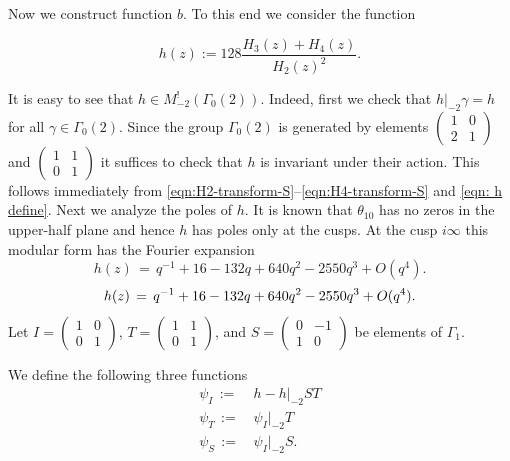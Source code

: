 Now we construct function $b$. To this end we consider the function
\begin{definition}\label{def: h}\leanok
\begin{equation}\label{eqn: h define}
    h(z) := 128 \frac{H_3(z) + H_4(z)}{H_2(z)^2}.
\end{equation}
\end{definition}
It is easy to see that $h\in M^!_{-2}(\Gamma_0(2))$. Indeed, first we check that $h|_{-2}\gamma=h$
for all $\gamma\in\Gamma_0(2)$. Since the group $\Gamma_0(2)$ is generated by elements
$\left(\begin{smallmatrix}1&0\\2&1\end{smallmatrix}\right)$ and $\left(\begin{smallmatrix}1&1\\0&1\end{smallmatrix}\right)$
it suffices to check that $h$ is invariant under their action. This follows immediately
from \eqref{eqn:H2-transform-S}--\eqref{eqn:H4-transform-S} and \eqref{eqn: h define}. Next we analyze the poles of $h$.
It is known \cite[Chapter~I Lemma~4.1]{Mumford} that $\theta_{10}$ has no zeros in the upper-half plane and hence $h$ has poles only at the cusps.
At the cusp $i\infty$ this modular form has the Fourier expansion
\ifplastex
\begin{equation*}
h(z)\,=\,q^{-1} + 16 - 132 q + 640 q^2 - 2550 q^3+O(q^4).
\end{equation*}
\else
\begin{equation}
h(z)\,=\,q^{-1} + 16 - 132 q + 640 q^2 - 2550 q^3+O(q^4).\notag
\end{equation}
\fi
Let $I=\left(\begin{smallmatrix}1&0\\0&1\end{smallmatrix}\right)$,
$T=\left(\begin{smallmatrix}1&1\\0&1\end{smallmatrix}\right)$, and
$S=\left(\begin{smallmatrix}0&-1\\1&0\end{smallmatrix}\right)$ be elements of $\Gamma_1$.
\begin{definition}\label{def:psiI-psiT-psiS}\leanok
We define the following three functions
\begin{align}
    \psi_I\,:=\,&h-h|_{-2}ST \label{eqn:psiI-define}\\
    \psi_T\,:=\,&\psi_I|_{-2}T \label{eqn:psiT-define}\\
    \psi_S\,:=\,&\psi_I|_{-2}S. \label{eqn:psiS-define}
\end{align}
\end{definition}

